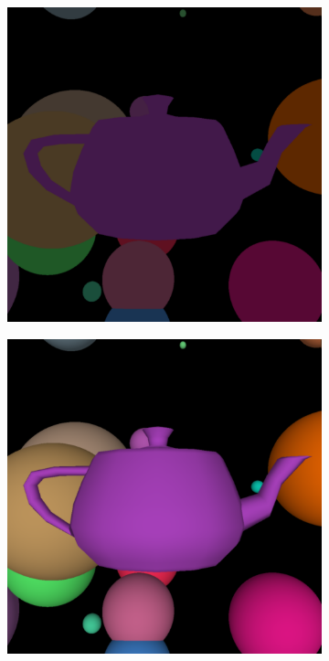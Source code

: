 \documentclass[acmsmall]{acmart}
\begin{document}
\begin{figure}[h]
    \centering
    
\begin{subfigure}{.3\textwidth}
  \centering
  \includegraphics[width=.9\linewidth]{img/ambientteapot.png}
\end{subfigure}%
\begin{subfigure}{.3\textwidth}
  \centering
  \includegraphics[width=.9\linewidth]{img/diffuseteapot.png}

\end{subfigure}
\end{figure}
\end{document}
